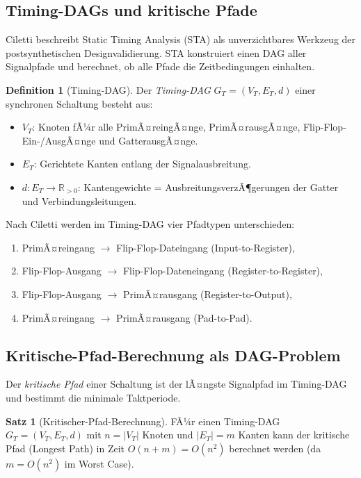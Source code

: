 ﻿\documentclass[a4paper,12pt]{article}
\theoremstyle{definition}
\newtheorem{definition}{Definition}
\newtheorem{satz}{Satz}
\begin{document}
\subsection{Timing-DAGs und kritische Pfade}

Ciletti \cite[Kap.~11, S.~769--780]{ciletti2011} beschreibt Static Timing Analysis
(STA) als unverzichtbares Werkzeug der postsynthetischen Designvalidierung. STA
konstruiert einen DAG aller Signalpfade und berechnet, ob alle Pfade die Zeitbedingungen
einhalten.

\begin{definition}[Timing-DAG]\label{def:timing_dag}
  Der \emph{Timing-DAG} $G_T = (V_T, E_T, d)$ einer synchronen Schaltung besteht aus:
  \begin{itemize}
    \item $V_T$: Knoten fÃ¼r alle PrimÃ¤reingÃ¤nge, PrimÃ¤rausgÃ¤nge, Flip-Flop-Ein-/AusgÃ¤nge
          und GatterausgÃ¤nge.
    \item $E_T$: Gerichtete Kanten entlang der Signalausbreitung.
    \item $d: E_T \to \mathbb{R}_{>0}$: Kantengewichte = AusbreitungsverzÃ¶gerungen der
          Gatter und Verbindungsleitungen.
  \end{itemize}
\end{definition}

Nach Ciletti \cite[S.~770]{ciletti2011} werden im Timing-DAG vier Pfadtypen unterschieden:
\begin{enumerate}
  \item PrimÃ¤reingang $\to$ Flip-Flop-Dateingang (Input-to-Register),
  \item Flip-Flop-Ausgang $\to$ Flip-Flop-Dateneingang (Register-to-Register),
  \item Flip-Flop-Ausgang $\to$ PrimÃ¤rausgang (Register-to-Output),
  \item PrimÃ¤reingang $\to$ PrimÃ¤rausgang (Pad-to-Pad).
\end{enumerate}

\subsection{Kritische-Pfad-Berechnung als DAG-Problem}

Der \emph{kritische Pfad} einer Schaltung ist der lÃ¤ngste Signalpfad im Timing-DAG und
bestimmt die minimale Taktperiode.

\begin{satz}[Kritischer-Pfad-Berechnung]\label{satz:krit_pfad}
  FÃ¼r einen Timing-DAG $G_T = (V_T, E_T, d)$ mit $n = |V_T|$ Knoten und $|E_T| = m$
  Kanten kann der kritische Pfad (Longest Path) in Zeit $O(n + m) = O(n^2)$ berechnet
  werden (da $m = O(n^2)$ im Worst Case).
\end{satz}
\end{document}
